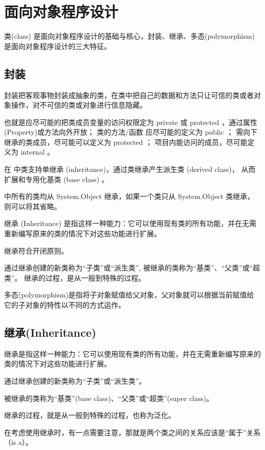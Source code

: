 
\chapter{\cs 面向对象程序设计}

类(class) 是面向对象程序设计的基础与核心，封装、继承、多态(polymorphism)是面向对象程序设计的三大特征。

\section{封装}

封装把客观事物封装成抽象的类，在类中把自己的数据和方法只让可信的类或者对象操作，对不可信的类或对象进行信息隐藏。

也就是应尽可能的把类成员变量的访问权限定为 private 或 protected ，通过属性(Property)或方法向外开放；
类的方法/函数 应尽可能的定义为 public ；
需向下继承的类成员，尽可能可以定义为 protected ；
项目内能访问的成员，尽可能定义为 internal 。

在 \cs 中类支持单继承 (inheritance)，通过类继承产生派生类 (derived class)，
从而扩展和专用化基类 (base class) 。

\cs 中所有的类均从 System.Object 继承，如果一个类只从 System.Object 类继承，
则可以将其省略。

继承 (Inheritance) 是指这样一种能力：它可以使用现有类的所有功能，并在无需重新编写原来的类的情况下对这些功能进行扩展。

继承符合开闭原则。

通过继承创建的新类称为“子类”或“派生类”, 被继承的类称为“基类”、“父类”或“超类”。
继承的过程，是从一般到特殊的过程。

多态(polymorphism)是指将子对象赋值给父对象，父对象就可以根据当前赋值给它的子对象的特性以不同的方式运作。



\section{继承(Inheritance)}

继承是指这样一种能力：它可以使用现有类的所有功能，并在无需重新编写原来的类的情况下对这些功能进行扩展。

通过继承创建的新类称为“子类”或“派生类”。

被继承的类称为“基类”(base class)、“父类”或“超类”(super class)。

继承的过程，就是从一般到特殊的过程，也称为泛化。

在考虑使用继承时，有一点需要注意，那就是两个类之间的关系应该是“属于”关系（is a）。

